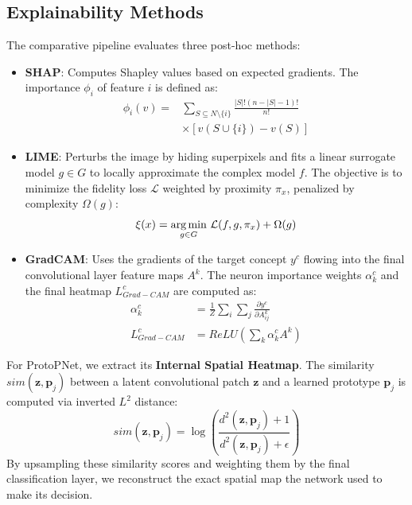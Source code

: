 \documentclass[conference]{IEEEtran}
\begin{document}
\subsection{Explainability Methods}
The comparative pipeline evaluates three post-hoc methods:
\begin{itemize}
    \item \textbf{SHAP}: Computes Shapley values based on expected gradients. The importance $\phi_i$ of feature $i$ is defined as:
    \begin{equation}
    \begin{split}
    \phi_i(v) = &\sum_{S \subseteq N \setminus \{i\}} \frac{|S|! (n - |S| - 1)!}{n!} \\
    &\times [v(S \cup \{i\}) - v(S)]
    \end{split}
    \end{equation}
    \item \textbf{LIME}: Perturbs the image by hiding superpixels and fits a linear surrogate model $g \in G$ to locally approximate the complex model $f$. The objective is to minimize the fidelity loss $\mathcal{L}$ weighted by proximity $\pi_x$, penalized by complexity $\Omega(g)$:
    \begin{equation}
    \xi(x) = \underset{g \in G}{\text{arg\,min}} \,\, \mathcal{L}(f, g, \pi_x) + \Omega(g)
    \end{equation}
    \item \textbf{GradCAM}: Uses the gradients of the target concept $y^c$ flowing into the final convolutional layer feature maps $A^k$. The neuron importance weights $\alpha_k^c$ and the final heatmap $L_{Grad-CAM}^c$ are computed as:
    \begin{equation}
    \begin{aligned}
    \alpha_k^c &= \frac{1}{Z} \sum_i \sum_j \frac{\partial y^c}{\partial A_{ij}^k} \\
    L_{Grad-CAM}^c &= ReLU \left( \sum_k \alpha_k^c A^k \right)
    \end{aligned}
    \end{equation}
\end{itemize}
For ProtoPNet, we extract its \textbf{Internal Spatial Heatmap}. The similarity $sim(\mathbf{z}, \mathbf{p}_j)$ between a latent convolutional patch $\mathbf{z}$ and a learned prototype $\mathbf{p}_j$ is computed via inverted $L^2$ distance:
\begin{equation}
sim(\mathbf{z}, \mathbf{p}_j) = \log\left(\frac{d^2(\mathbf{z}, \mathbf{p}_j) + 1}{d^2(\mathbf{z}, \mathbf{p}_j) + \epsilon}\right)
\end{equation}
By upsampling these similarity scores and weighting them by the final classification layer, we reconstruct the exact spatial map the network used to make its decision.
\end{document}
